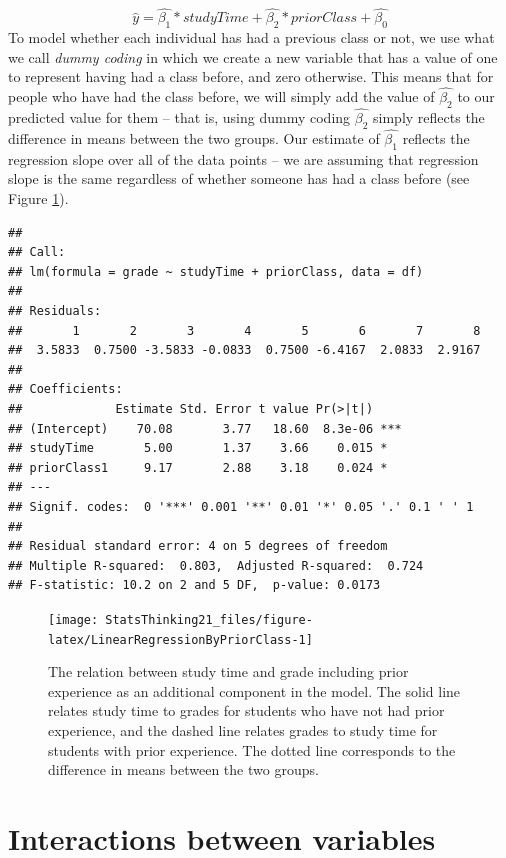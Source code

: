 \documentclass[12pt,]{book}
\theoremstyle{definition}
\theoremstyle{definition}
\theoremstyle{definition}
\theoremstyle{remark}
\begin{document}
\[
\hat{y} = \hat{\beta_1}*studyTime + \hat{\beta_2}*priorClass + \hat{\beta_0}
\]
To model whether each individual has had a previous class or not, we use what we call \emph{dummy coding} in which we create a new variable that has a value of one to represent having had a class before, and zero otherwise. This means that for people who have had the class before, we will simply add the value of \(\hat{\beta_2}\) to our predicted value for them -- that is, using dummy coding \(\hat{\beta_2}\) simply reflects the difference in means between the two groups. Our estimate of \(\hat{\beta_1}\) reflects the regression slope over all of the data points -- we are assuming that regression slope is the same regardless of whether someone has had a class before (see Figure \ref{fig:LinearRegressionByPriorClass}).

\begin{verbatim}
## 
## Call:
## lm(formula = grade ~ studyTime + priorClass, data = df)
## 
## Residuals:
##       1       2       3       4       5       6       7       8 
##  3.5833  0.7500 -3.5833 -0.0833  0.7500 -6.4167  2.0833  2.9167 
## 
## Coefficients:
##             Estimate Std. Error t value Pr(>|t|)    
## (Intercept)    70.08       3.77   18.60  8.3e-06 ***
## studyTime       5.00       1.37    3.66    0.015 *  
## priorClass1     9.17       2.88    3.18    0.024 *  
## ---
## Signif. codes:  0 '***' 0.001 '**' 0.01 '*' 0.05 '.' 0.1 ' ' 1
## 
## Residual standard error: 4 on 5 degrees of freedom
## Multiple R-squared:  0.803,  Adjusted R-squared:  0.724 
## F-statistic: 10.2 on 2 and 5 DF,  p-value: 0.0173
\end{verbatim}

\begin{figure}
\texttt{[image: StatsThinking21\_files/figure-latex/LinearRegressionByPriorClass-1]} \caption{The relation between study time and grade including prior experience as an additional component in the model.  The solid line relates study time to grades for students who have not had prior experience, and the dashed line relates grades to study time for students with prior experience. The dotted line corresponds to the difference in means between the two groups.}\label{fig:LinearRegressionByPriorClass}
\end{figure}

\hypertarget{interactions-between-variables}{%
\section{Interactions between variables}\label{interactions-between-variables}}
\end{document}
